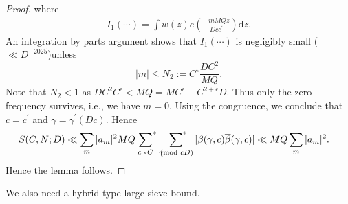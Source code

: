 \documentclass[12pt,a4paper,twoside, reqno]{amsart}
\newcommand{\shortmod}{\ensuremath{\negthickspace \negthickspace \negthickspace \pmod}}
\newcommand{\sumstar}{\sideset{}{^*}\sum}
\newtheorem{lemma}{Lemma}
\begin{document}
\begin{proof}
where 
\begin{align}\label{integral poisson 3}
    I_1(\cdots)= \int w(z)    e\left( \frac{-mMQz}{Dcc^\prime}\right) \mathrm{d}z.
\end{align}
An integration by parts argument shows that $ I_1(\cdots)$ is negligibly small ($\ll D^{-2025}$)unless 
$$ |m| \leq N_2:=C^{\epsilon} \frac{DC^2}{ MQ}. $$
Note that $N_2<1$ as 
 $DC^2C^\epsilon < MQ=MC^\epsilon+ C^{2+\epsilon}D.$   Thus only the zero--frequency survives, i.e., we have $m=0$.
Using the congruence, we conclude that $c=c^\prime$ and $\gamma=\gamma^\prime (Dc)$. Hence 
 \begin{align*}
    S(C,N;D)  \ll \sum_m|a_m|^2MQ &     \mathop{\sumstar_{ \substack{c \sim {C}{  }
       } } }  \ \sumstar_{\substack{ \gamma \shortmod{cD}}  }   |\beta(\gamma,c) \overline{\beta}( \gamma,  c)|   \ll MQ \sum_m|a_m|^2.
\end{align*}
Hence the lemma follows.
\end{proof}
We also need a hybrid-type large sieve bound.
\end{document}
